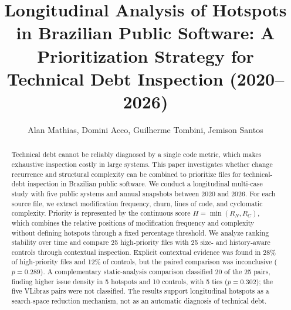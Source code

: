 \documentclass[12pt]{article}
\title{Longitudinal Analysis of Hotspots in Brazilian Public Software: A Prioritization Strategy for Technical Debt Inspection (2020--2026)}
\author{Alan Mathias\inst{1}, Domini Acco\inst{1}, Guilherme Tombini\inst{1}, Jemison Santos\inst{1}}
\begin{document}
\maketitle

\begin{abstract}
Technical debt cannot be reliably diagnosed by a single code metric, which makes exhaustive inspection costly in large systems. This paper investigates whether change recurrence and structural complexity can be combined to prioritize files for technical-debt inspection in Brazilian public software. We conduct a longitudinal multi-case study with five public systems and annual snapshots between 2020 and 2026. For each source file, we extract modification frequency, churn, lines of code, and cyclomatic complexity. Priority is represented by the continuous score $H=\min(R_N,R_C)$, which combines the relative positions of modification frequency and complexity without defining hotspots through a fixed percentage threshold. We analyze ranking stability over time and compare 25 high-priority files with 25 size- and history-aware controls through contextual inspection. Explicit contextual evidence was found in 28\% of high-priority files and 12\% of controls, but the paired comparison was inconclusive ($p=0.289$). A complementary static-analysis comparison classified 20 of the 25 pairs, finding higher issue density in 5 hotspots and 10 controls, with 5 ties ($p=0.302$); the five VLibras pairs were not classified. The results support longitudinal hotspots as a search-space reduction mechanism, not as an automatic diagnosis of technical debt.
\end{abstract}
\end{document}
